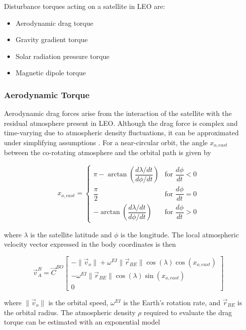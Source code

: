 Disturbance torques acting on a satellite in LEO are:
\begin{itemize}
    \item Aerodynamic drag torque
    \item Gravity gradient torque
    \item Solar radiation pressure torque
    \item Magnetic dipole torque
\end{itemize} 

\subsubsection{Aerodynamic Torque}
Aerodynamic drag forces arise from the interaction of the satellite with the residual atmosphere present in LEO. Although the drag force is complex and time-varying due to atmospheric density fluctuations, it can be approximated under simplifying assumptions \cite{auretDesignAerodynamicAttitude2011}. For a near-circular orbit, the angle $x_{o,east}$ between the co-rotating atmosphere and the orbital path is given by

\begin{equation}
    x_{o,east} = \begin{cases}
        \pi - \arctan\!\left(\dfrac{d\lambda/dt}{d\phi/dt}\right) & \text{for } \dfrac{d\phi}{dt} < 0 \\[8pt]
        \dfrac{\pi}{2} & \text{for } \dfrac{d\phi}{dt} = 0 \\[8pt]
        -\arctan\!\left(\dfrac{d\lambda/dt}{d\phi/dt}\right) & \text{for } \dfrac{d\phi}{dt} > 0
    \end{cases}
\end{equation}

where $\lambda$ is the satellite latitude and $\phi$ is the longitude. The local atmospheric velocity vector expressed in the body coordinates is then

\begin{equation}
    \vec{v}^B_A = \vec{C}^{BO}
    \begin{bmatrix}
        -\|\vec{v}_o\| + \omega^{EI} \|\vec{r}_{BE}\| \cos(\lambda)\cos(x_{o,east}) \\
        -\omega^{EI} \|\vec{r}_{BE}\| \cos(\lambda)\sin(x_{o,east}) \\
        0
    \end{bmatrix}
\end{equation}

where $\|\vec{v}_o\|$ is the orbital speed, $\omega^{EI}$ is the Earth's rotation rate, and $\vec{r}_{BE}$ is the orbital radius. The atmospheric density $\rho$ required to evaluate the drag torque can be estimated with an exponential model

